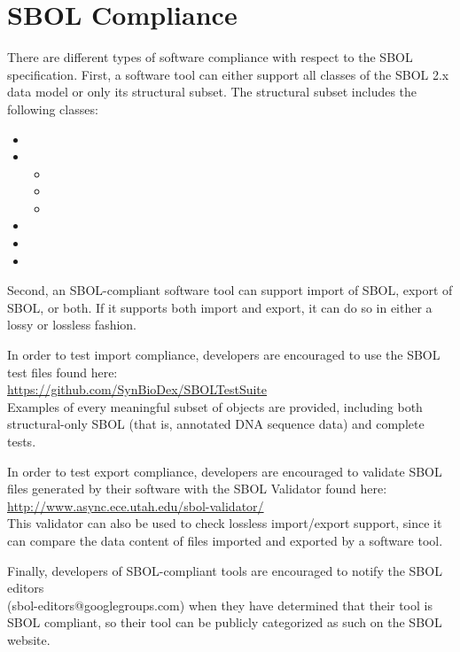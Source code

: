 \section{SBOL Compliance}


There are different types of software compliance with respect to the SBOL specification.  First, a software tool can either support all classes of the SBOL 2.x data model or only its structural subset.  The structural subset includes the following classes:
\begin{itemize}
\item {}
\item {}
\begin{itemize}
\item {}
\item {}
\item {}
\end{itemize}
\item {}
\item {}
\item {}
\end{itemize}
Second, an SBOL-compliant software tool can support import of SBOL, export of SBOL, or both.  
If it supports both import and export, it can do so in either a lossy or lossless fashion.

In order to test import compliance, developers are encouraged to use the SBOL test files found here:\\ {\url{https://github.com/SynBioDex/SBOLTestSuite}}\\
Examples of every meaningful subset of objects are provided, including both structural-only SBOL (that is, annotated DNA sequence data) and complete tests.  

In order to test export compliance, developers are encouraged to validate SBOL files generated by their software with the SBOL Validator found here:\\
\url{http://www.async.ece.utah.edu/sbol-validator/}\\
This validator can also be used to check lossless import/export support, since it can compare the data content of files imported and exported by a software tool.

Finally, developers of SBOL-compliant tools are encouraged to notify the SBOL editors\\(sbol-editors@googlegroups.com) when they have determined that their tool is SBOL compliant, so their tool can be publicly categorized as such on the SBOL website.


